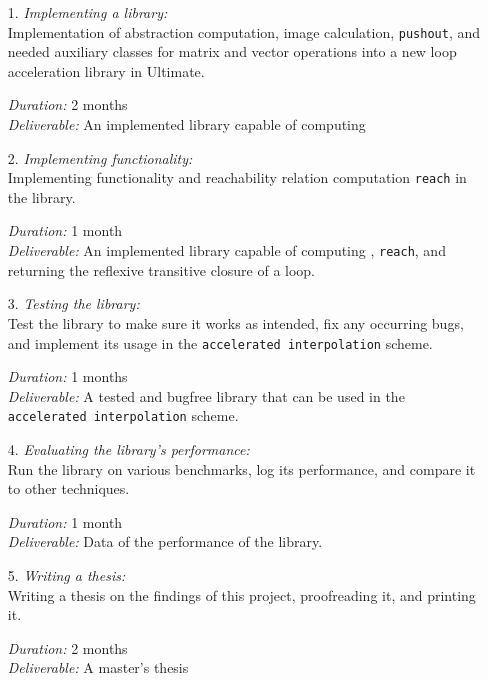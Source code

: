 \begin{itemize}
	\item[1.] \textsl{Implementing a \qvasr library:} \\
               Implementation of \qvasr abstraction computation, \qvasr image calculation, \texttt{pushout}, and needed auxiliary classes for matrix and vector operations into a new loop acceleration library in Ultimate.

			  \textsl{Duration:} 2 months \\
			  \textsl{Deliverable:} An implemented library capable of computing \qvasr

	\item[2.] \textsl{Implementing \qvasrs functionality:} \\
               Implementing \qvasrs functionality and reachability relation computation \texttt{reach} in the \qvasr library.

			  \textsl{Duration:} 1 month \\
			  \textsl{Deliverable:} An implemented library capable of computing \qvasrs, \texttt{reach}, and returning the reflexive transitive closure of a loop.

	\item[3.] \textsl{Testing the library:} \\
               Test the library to make sure it works as intended, fix any occurring bugs, and implement its usage in the \texttt{accelerated interpolation} scheme.

			  \textsl{Duration:} 1 months \\
			  \textsl{Deliverable:} A tested and bugfree \qvasr library that can be used in the \texttt{accelerated interpolation} scheme.

	\item[4.] \textsl{Evaluating the library's performance:} \\
               Run the library on various benchmarks, log its performance, and compare it to other techniques.

			  \textsl{Duration:} 1 month \\
			  \textsl{Deliverable:} Data of the performance of the \qvasr library.

	\item[5.] \textsl{Writing a thesis:} \\
              Writing a thesis on the findings of this project, proofreading it, and printing it.

			  \textsl{Duration:} 2 months \\
			  \textsl{Deliverable:}	A master's thesis
\end{itemize}
